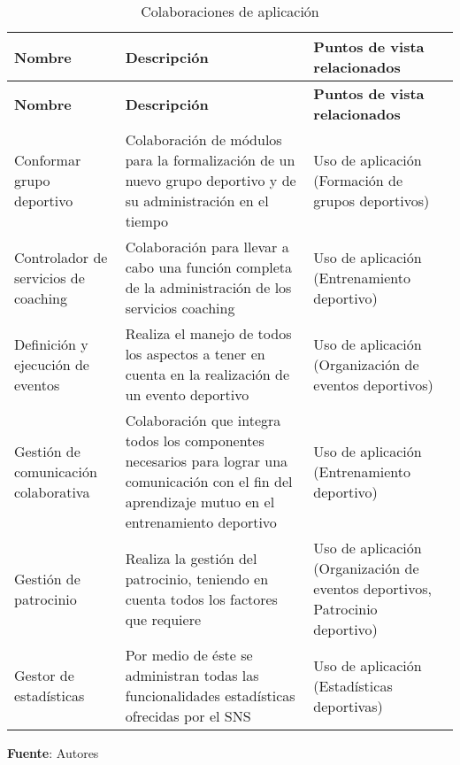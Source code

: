\begin{center}
	\begin{longtable}{|p{4cm}|p{7cm}|p{4cm}|}
		\caption{Colaboraciones de aplicación \label{tab:colaboraciones_aplicacion}} \\
		\hline
		\textbf{Nombre} &
		\textbf{Descripción} &
		\textbf{Puntos de vista relacionados} \\
		\hline
		\endfirsthead
		\hline
		\textbf{Nombre} &
		\textbf{Descripción} &
		\textbf{Puntos de vista relacionados} \\
		\hline
		\endhead
		\hline
		\endfoot
		\hline
		\endlastfoot
					Conformar grupo deportivo & 
			Colaboración de módulos para la formalización de un nuevo grupo deportivo y de su administración en el tiempo & 
			Uso de aplicación (Formación de grupos deportivos)
			\\
			\hline
			Controlador de servicios de coaching & 
			Colaboración para llevar a cabo una función completa de la administración de los servicios coaching & 
			Uso de aplicación (Entrenamiento deportivo)
			\\
			\hline
			Definición y ejecución de eventos & 
			Realiza el manejo de todos los aspectos a tener en cuenta en la realización de un evento deportivo & 
			Uso de aplicación (Organización de eventos deportivos)
			\\
			\hline
			Gestión de comunicación colaborativa & 
			Colaboración que integra todos los componentes necesarios para lograr una comunicación con el fin del aprendizaje mutuo en el entrenamiento deportivo & 
			Uso de aplicación (Entrenamiento deportivo)
			\\
			\hline
			Gestión de patrocinio & 
			Realiza la gestión del patrocinio, teniendo en cuenta todos los factores que requiere & 
			Uso de aplicación (Organización de eventos deportivos, Patrocinio deportivo)
			\\
			\hline
			Gestor de estadísticas & 
			Por medio de éste se administran todas las funcionalidades estadísticas ofrecidas por el SNS & 
			Uso de aplicación (Estadísticas deportivas)
			\\
			\hline
	\end{longtable}
	\textbf{Fuente}: Autores
\end{center}


